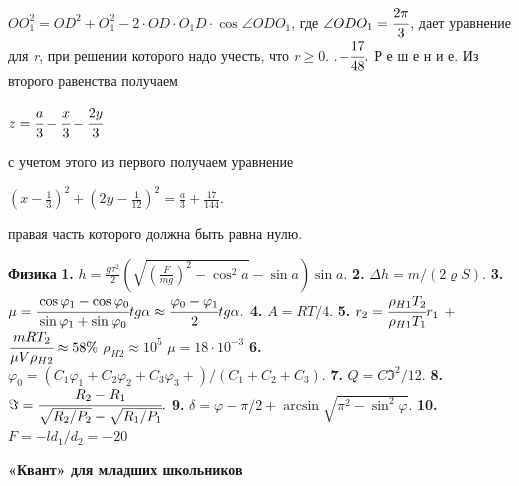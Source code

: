 \documentclass[8pt,twocolumn,a4paper]{article}
\begin{document}
\\\small
$OO_{1}^2=OD^2+O_{1}^2- 2 \cdot OD \cdot O_{1}D\cdot \cos{\angle ODO_{1}}$, где
$\angle ODO_{1} = \cfrac{2\pi}{3}$, дает уравнение для {\it r}, при решении которого надо учесть, что {\it r}$\geq0$. .$-\cfrac{17}{48}.$   Р е ш е н и е. Из второго равенства получаем
\begin{center}
  $z=\cfrac{a}{3} - \cfrac{x}{3} - \cfrac{2y}{3}$  
\end{center}

 с учетом этого из первого получаем уравнение
\begin{center}
    \large$(x-\frac{1}{3})^2+(2y-\frac{1}{12})^2 = \frac{a}{3} + \frac{17}{144}.$
\end{center}
правая часть которого должна быть равна нулю.

\newline
\textbf{Физика} \newline \newline
\textbf{1.} \large$h= \frac{g\tau^2}{2}(\sqrt{(\frac{F}{mg})^2-\cos^2{a}}-\sin{a})\sin{a}.$ \newline
\textbf{2.} $\Delta h= m/(2\varrho S).$ \newline
\textbf{3.} $\mu=\cfrac{\cos{\varphi_{1}}-\cos{\varphi_{0}}} {\sin{\varphi_{1}}+ \sin{\varphi_{0}}}tg{\alpha} \approx \cfrac{\varphi_{0}-\varphi_{1}}{2}tg{\alpha}.$ \newline
\textbf{4.} $A= RT/4.      $ \newline
\textbf{5.} \large $r_{2} = \cfrac{\rho_{H1}T_{2}}{\rho_{H1}T_{1}}r_{1}$ + $\cfrac{mRT_{2}}{\mu V \rho_{H2}} \approx 58\%$ \newline {} $\rho_{H2} \approx 10^5$  $\mu = 18 \cdot 10^{-3}$  \newline
\textbf{6.} $\varphi_{0} = (C_{1}\varphi_{1}+C_{2}\varphi_{2}+C_{3}\varphi_{3}+)/(C_{1}+C_{2}+C_{3}). $
\newline\textbf{7.} $ Q=C\Im^{2} / 12. $ \newline
\textbf{8.} $ \Im = \cfrac{R_{2}-R_{1}}{    \sqrt{R_{2}/P_{2}} - \sqrt{R_{1}/P_{1}}             } .  $ \newline
\textbf{9.} $ \delta = \varphi - \pi / 2 + \arcsin{ \sqrt{\pi^2-\sin^2{\varphi}}    } . $ \newline
\textbf{10.} $F=-ld_{1}/d_{2}= -20 $  \newline


\textbf{\small«Квант» для младших школьников} \newline
\end{document}

